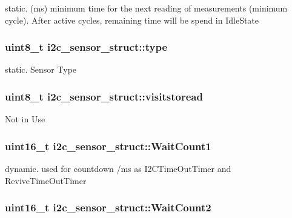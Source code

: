 static. (ms) minimum time for the next reading of measurements (minimum cycle). After active cycles, remaining time will be spend in Idle\-State \hypertarget{structi2c__sensor__struct_a69705de26716935cb3e9e9f70a3c1014}{
\subsubsection[{type}]{\setlength{\rightskip}{0pt plus 5cm}uint8\-\_\-t i2c\-\_\-sensor\-\_\-struct\-::type}}\label{structi2c__sensor__struct_a69705de26716935cb3e9e9f70a3c1014}
static. Sensor Type \hypertarget{structi2c__sensor__struct_ac0a02a2e50437d7381e0d9dd84036739}{
\subsubsection[{visitstoread}]{\setlength{\rightskip}{0pt plus 5cm}uint8\-\_\-t i2c\-\_\-sensor\-\_\-struct\-::visitstoread}}\label{structi2c__sensor__struct_ac0a02a2e50437d7381e0d9dd84036739}
Not in Use \hypertarget{structi2c__sensor__struct_a2825f6177b0df344143181d18e1ac249}{
\subsubsection[{Wait\-Count1}]{\setlength{\rightskip}{0pt plus 5cm}uint16\-\_\-t i2c\-\_\-sensor\-\_\-struct\-::\-Wait\-Count1}}\label{structi2c__sensor__struct_a2825f6177b0df344143181d18e1ac249}
dynamic. used for countdown /ms as I2\-C\-Time\-Out\-Timer and Revive\-Time\-Out\-Timer \hypertarget{structi2c__sensor__struct_a7dc7691c63a244df47970dcc62e04fd6}{
\subsubsection[{Wait\-Count2}]{\setlength{\rightskip}{0pt plus 5cm}uint16\-\_\-t i2c\-\_\-sensor\-\_\-struct\-::\-Wait\-Count2}}\label{structi2c__sensor__struct_a7dc7691c63a244df47970dcc62e04fd6}
